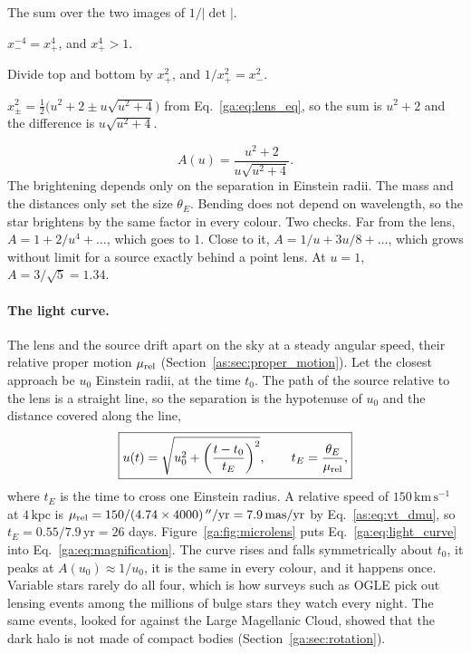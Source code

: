\begin{explain}
	\item The sum over the two images of $1/|\det|$.
	\item $x_-^{-4}=x_+^4$, and $x_+^4>1$.
	\item Divide top and bottom by $x_+^2$, and $1/x_+^2=x_-^2$.
	\item $x_\pm^2=\tfrac12\big(u^2+2\pm u\sqrt{u^2+4}\big)$ from Eq.~\eqref{ga:eq:lens_eq}, so the sum is $u^2+2$ and the difference is $u\sqrt{u^2+4}$.
\end{explain}
\begin{equation}
	\boxed{A(u)=\frac{u^2+2}{u\sqrt{u^2+4}}.}
	\label{ga:eq:magnification}
\end{equation}
The brightening depends only on the separation in Einstein radii. The mass and the distances only set the size $\theta_E$. Bending does not depend on wavelength, so the star brightens by the same factor in every colour. Two checks. Far from the lens, $A=1+2/u^4+\dots$, which goes to $1$. Close to it, $A=1/u+3u/8+\dots$, which grows without limit for a source exactly behind a point lens. At $u=1$, $A=3/\sqrt5=1.34$.

\paragraph{The light curve.} The lens and the source drift apart on the sky at a steady angular speed, their relative proper motion $\mu_{\rm rel}$ (Section~\ref{as:sec:proper_motion}). Let the closest approach be $u_0$ Einstein radii, at the time $t_0$. The path of the source relative to the lens is a straight line, so the separation is the hypotenuse of $u_0$ and the distance covered along the line,
\begin{equation}
	\boxed{u(t)=\sqrt{u_0^2+\left(\frac{t-t_0}{t_E}\right)^2},\qquad t_E=\frac{\theta_E}{\mu_{\rm rel}},}
	\label{ga:eq:light_curve}
\end{equation}
where $t_E$ is the time to cross one Einstein radius. A relative speed of $150\,\mathrm{km\,s^{-1}}$ at $4\,\mathrm{kpc}$ is $\mu_{\rm rel}=150/(4.74\times4000)\,''/\mathrm{yr}=7.9\,\mathrm{mas/yr}$ by Eq.~\eqref{as:eq:vt_dmu}, so $t_E=0.55/7.9\,\mathrm{yr}=26$ days. Figure~\ref{ga:fig:microlens} puts Eq.~\eqref{ga:eq:light_curve} into Eq.~\eqref{ga:eq:magnification}. The curve rises and falls symmetrically about $t_0$, it peaks at $A(u_0)\approx1/u_0$, it is the same in every colour, and it happens once. Variable stars rarely do all four, which is how surveys such as OGLE pick out lensing events among the millions of bulge stars they watch every night. The same events, looked for against the Large Magellanic Cloud, showed that the dark halo is not made of compact bodies (Section~\ref{ga:sec:rotation}).


